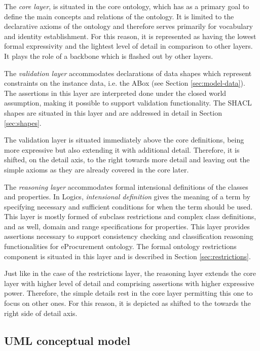 	The \textit{core layer}, is situated in the core ontology, which has as a primary goal to define the main concepts and relations of the ontology. It is limited to the declarative axioms of the ontology and therefore serves primarily for vocabulary and identity establishment. For this reason, it is represented as having the lowest formal expressivity and the lightest level of detail in comparison to other layers. It plays the role of a backbone which is flashed out by other layers. 

	The \textit{validation layer} accommodates declarations of data shapes which represent constraints on the instance data, i.e. the ABox (see Section \ref{sec:model-data}). The assertions in this layer are interpreted done under the closed world assumption, making it possible to support validation functionality. The SHACL shapes are situated in this layer and are addressed in detail in Section \ref{sec:shapes}.
	
	The validation layer is situated immediately above the core definitions, being more expressive but also extending it with additional detail. Therefore, it is shifted, on the detail axis, to the right towards more detail and leaving out the simple axioms as they are already covered in the core later.
	
	The \textit{reasoning layer} accommodates formal intensional definitions of the classes and properties. In Logics, \textit{intensional definition} gives the meaning of a term by specifying necessary and sufficient conditions for when the term should be used. This layer is mostly formed of subclass restrictions and complex class definitions, and as well, domain and range specifications for properties. This layer provides assertions necessary to support consistency checking and classification reasoning functionalities for eProcurement ontology. The formal ontology restrictions component is situated in this layer and is described in Section \ref{sec:restrictions}.
	
	Just like in the case of the restrictions layer, the reasoning layer extends the core layer with higher level of detail and comprising assertions with higher expressive power. Therefore, the simple details rest in the core layer permitting this one to focus on other ones. For this reason, it is depicted as shifted to the towards the right side of detail axis.
	
	
	\subsection{UML conceptual model}
	\label{sec:uml-model}	
	
